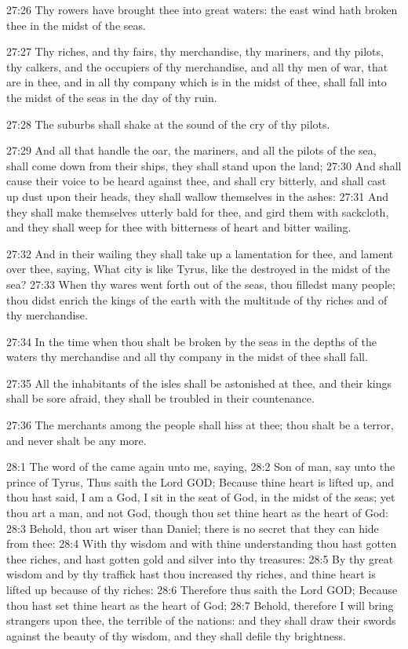 27:26 Thy rowers have brought thee into great waters: the east wind
hath broken thee in the midst of the seas.

27:27 Thy riches, and thy fairs, thy merchandise, thy mariners, and
thy pilots, thy calkers, and the occupiers of thy merchandise, and all
thy men of war, that are in thee, and in all thy company which is in
the midst of thee, shall fall into the midst of the seas in the day of
thy ruin.

27:28 The suburbs shall shake at the sound of the cry of thy pilots.

27:29 And all that handle the oar, the mariners, and all the pilots of
the sea, shall come down from their ships, they shall stand upon the
land; 27:30 And shall cause their voice to be heard against thee, and
shall cry bitterly, and shall cast up dust upon their heads, they
shall wallow themselves in the ashes: 27:31 And they shall make
themselves utterly bald for thee, and gird them with sackcloth, and
they shall weep for thee with bitterness of heart and bitter wailing.

27:32 And in their wailing they shall take up a lamentation for thee,
and lament over thee, saying, What city is like Tyrus, like the
destroyed in the midst of the sea?  27:33 When thy wares went forth
out of the seas, thou filledst many people; thou didst enrich the
kings of the earth with the multitude of thy riches and of thy
merchandise.

27:34 In the time when thou shalt be broken by the seas in the depths
of the waters thy merchandise and all thy company in the midst of thee
shall fall.

27:35 All the inhabitants of the isles shall be astonished at thee,
and their kings shall be sore afraid, they shall be troubled in their
countenance.

27:36 The merchants among the people shall hiss at thee; thou shalt be
a terror, and never shalt be any more.

28:1 The word of the \LORD came again unto me, saying, 28:2 Son of man,
say unto the prince of Tyrus, Thus saith the Lord GOD; Because thine
heart is lifted up, and thou hast said, I am a God, I sit in the seat
of God, in the midst of the seas; yet thou art a man, and not God,
though thou set thine heart as the heart of God: 28:3 Behold, thou art
wiser than Daniel; there is no secret that they can hide from thee:
28:4 With thy wisdom and with thine understanding thou hast gotten
thee riches, and hast gotten gold and silver into thy treasures: 28:5
By thy great wisdom and by thy traffick hast thou increased thy
riches, and thine heart is lifted up because of thy riches: 28:6
Therefore thus saith the Lord GOD; Because thou hast set thine heart
as the heart of God; 28:7 Behold, therefore I will bring strangers
upon thee, the terrible of the nations: and they shall draw their
swords against the beauty of thy wisdom, and they shall defile thy
brightness.

